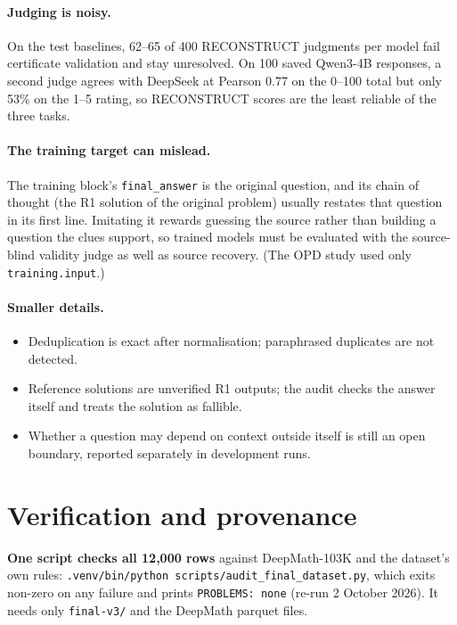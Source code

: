 \documentclass[11pt,a4paper]{article}
\newcommand{\code}[1]{\texttt{#1}}
\begin{document}
\paragraph{Judging is noisy.} On the test baselines, 62--65 of 400 RECONSTRUCT judgments per model fail certificate validation and stay unresolved. On 100 saved Qwen3-4B responses, a second judge agrees with DeepSeek at Pearson 0.77 on the 0--100 total but only 53\% on the 1--5 rating, so RECONSTRUCT scores are the least reliable of the three tasks.

\paragraph{The training target can mislead.} The training block's \code{final\_answer} is the original question, and its chain of thought (the R1 solution of the original problem) usually restates that question in its first line. Imitating it rewards guessing the source rather than building a question the clues support, so trained models must be evaluated with the source-blind validity judge as well as source recovery. (The OPD study used only \code{training.input}.)

\paragraph{Smaller details.}
\begin{itemize}
\item Deduplication is exact after normalisation; paraphrased duplicates are not detected.
\item Reference solutions are unverified R1 outputs; the audit checks the answer itself and treats the solution as fallible.
\item Whether a question may depend on context outside itself is still an open boundary, reported separately in development runs.
\end{itemize}

\section{Verification and provenance}

\textbf{One script checks all 12,000 rows} against DeepMath-103K and the dataset's own rules: \nolinkurl{.venv/bin/python scripts/audit_final_dataset.py}, which exits non-zero on any failure and prints \code{PROBLEMS: none} (re-run 2 October 2026). It needs only \code{final-v3/} and the DeepMath parquet files.
\end{document}
